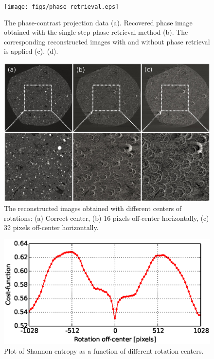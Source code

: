 \documentclass[pdf]{iucr}              %
\begin{document}
\begin{figure}
\centering
\texttt{[image: figs/phase\_retrieval.eps]}
\caption{The phase-contrast projection data (a). Recovered phase image obtained with the single-step phase retrieval method (b). The corresponding reconstructed images with and without phase retrieval is applied (c), (d).}
\label{fig:ProcessPhase}
\end{figure}

\begin{figure}
\centering
\includegraphics[width=\textwidth]{figs/center_optimize.eps}
\caption{The reconstructed images obtained with different centers of rotations: (a) Correct center, (b) 16 pixels  off-center horizontally, (c) 32 pixels off-center horizontally.}
\label{fig:OptimizeCenter1}
\end{figure}

\begin{figure}
\centering
\includegraphics[width=\textwidth]{figs/center_costfunc.eps}
\caption{Plot of Shannon entropy as a function of different rotation centers. }
\label{fig:OptimizeCenter2}
\end{figure}

 
\end{document}
